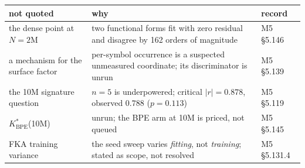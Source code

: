 \footnotesize
\begin{tabular}{@{}p{3.5cm}p{8.3cm}p{2.2cm}@{}}
\toprule
not quoted & why & record \\
\midrule
the dense point at $N=2$M & two functional forms fit with zero residual and disagree by 162 orders of magnitude & M5 \S5.146 \\
a mechanism for the surface factor & per-symbol occurrence is a suspected unmeasured coordinate; its discriminator is unrun & M5 \S5.139 \\
the 10M signature question & $n=5$ is underpowered; critical $|r|=0.878$, observed $0.788$ ($p=0.113$) & M5 \S5.119 \\
$K^*_{\text{BPE}}$(10M) & unrun; the BPE arm at 10M is priced, not queued & M5 \S5.145 \\
FKA training variance & the seed sweep varies \emph{fitting}, not \emph{training}; stated as scope, not resolved & M5 \S5.131.4 \\
\bottomrule
\end{tabular}
